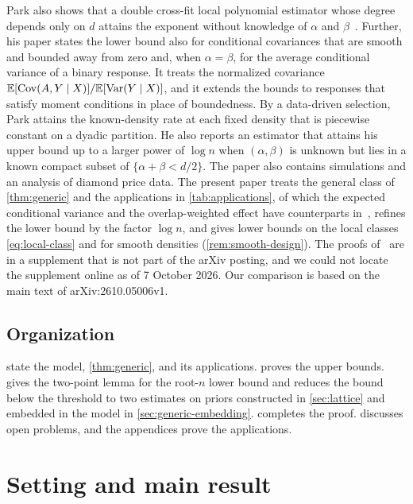 Park also shows that a double cross-fit local polynomial estimator
whose degree depends only on $d$ attains the exponent without knowledge
of $\alpha$ and $\beta$~\cite[Corollary~1]{park}. Further, his paper
states the lower bound also for conditional covariances that are
smooth and bounded away from zero and, when $\alpha=\beta$, for the
average conditional variance of a binary response. It treats the
normalized covariance $\mathbb E[\operatorname{Cov}(A,Y\mid X)]/\mathbb E[\operatorname{Var}(Y\mid X)]$, and it
extends the bounds to responses that satisfy moment conditions in place
of boundedness. By a data-driven selection, Park attains the
known-density rate at each fixed density that is piecewise constant on
a dyadic partition. He also reports an estimator that attains his
upper bound up to a larger power of $\log n$ when $(\alpha,\beta)$ is
unknown but lies in a known compact subset of $\{\alpha+\beta<d/2\}$.
The paper also contains simulations and an analysis of diamond price
data. The present paper treats the general class of
\cref{thm:generic} and the applications in \cref{tab:applications}, of
which the expected conditional variance and the overlap-weighted effect
have counterparts in~\cite{park},
refines the lower bound by the factor $\log n$, and gives lower bounds
on the local classes \eqref{eq:local-class} and for smooth densities
(\cref{rem:smooth-design}). The proofs of~\cite{park} are in a
supplement that is not part of the arXiv posting, and we could not
locate the supplement online as of 7 October 2026. Our comparison is
based on the main text of arXiv:2610.05006v1.

\section{Organization}\label{sec:intro-organization}

 state the model,
\cref{thm:generic}, and its applications. 
proves the upper bounds.  gives the two-point
lemma for the root-$n$ lower bound and reduces the bound below the
threshold to two estimates
on priors constructed in \cref{sec:lattice} and embedded in the
model in \cref{sec:generic-embedding}. 
completes the proof.  discusses open problems,
and the appendices prove the applications.
\chapter{Setting and main result}\label{sec:models}

